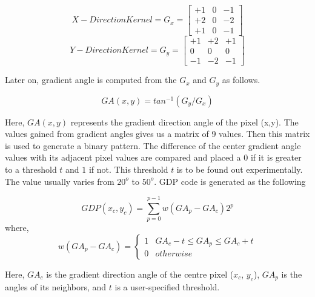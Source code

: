 \documentclass[conference]{IEEEtran}
\begin{document}
\begin{center}
	\[
	X - Direction Kernel = G_x = 
	\begin{bmatrix}
	+1 & 0 & -1 \\
	+2 & 0 & -2 \\
	+1 & 0 & -1
	\end{bmatrix}
	\]
	\[
	Y - Direction Kernel = G_y = 
	\begin{bmatrix}
	+1 & +2 & +1 \\
	0 & 0 & 0 \\
	-1 & -2 & -1
	\end{bmatrix}
	\]
\end{center}

Later on, gradient angle is computed from the $G_x$ and $G_y$ as follows.

\begin{equation}
 GA (x,y) = tan^{-1}(G_y/G_x)
\end{equation}

Here, $GA (x,y)$ represents the gradient direction angle of the pixel (x,y). The values gained from gradient angles gives us a matrix of 9 values. Then this matrix is used to generate a binary pattern. The difference of the center gradient angle values with its adjacent pixel values are compared and placed a $0$ if it is greater to a threshold $t$ and $1$ if not. This threshold $t$ is to be found out experimentally. The value usually varies from $20^o$ to $50^o$. GDP code is generated as the following

\begin{equation}
GDP ({x_c, y_c})=\sum_{p=0}^{p-1} w (GA_p - GA_c) 2^p
\end{equation}
where,
\begin{equation}
 w (GA_p - GA_c) =
\begin{cases}
1 & GA_c - t \leq GA_p \leq GA_c + t\\
0 & otherwise
\end{cases}
\end{equation}

Here, $GA_c$ is the gradient direction angle of the centre pixel ($x_c$, $y_c$), $GA_p$ is the angles of its neighbors, and $t$ is a user-specified threshold.
\end{document}
